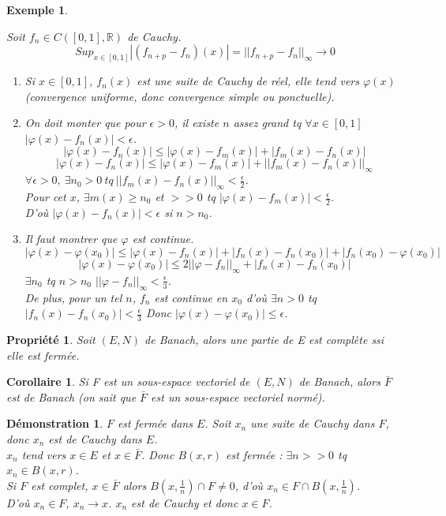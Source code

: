 \documentclass[a4paper, oneside]{report}
\theoremstyle{break}
\newtheorem{propr}[thm]{Propriété}
\newtheorem{cor}[thm]{Corollaire}
\newtheorem{exem}[thm]{Exemple}
\newtheorem*{demo}{Démonstration}
\newcommand{\R}{\mathbb{R}}
\newcommand{\sev}{sous-espace vectoriel }
\newcommand{\fracun}[1]{\frac{1}{#1}}
\begin{document}
\begin{exem}
\begin{enumerate}
Soit $f_n\in C([0,1],\R)$ de Cauchy.
$$Sup_{x\in [0,1]} |(f_{n+p}-f_n)(x)| = ||f_{n+p}-f_n||_\infty \rightarrow 0$$
\begin{enumerate}
\item Si $x\in [0,1]$, $f_n(x)$ est une suite de Cauchy de réel, elle tend vers $\varphi(x)$ (convergence uniforme, donc convergence simple ou ponctuelle).\\
\item On doit monter que pour $\epsilon >0$, il existe $n$ assez grand tq $\forall x\in [0,1]$ $|\varphi(x)-f_n(x)|<\epsilon$.\\
$$|\varphi(x)-f_n(x)| \leq |\varphi(x)-f_m(x)|+|f_m(x)-f_n(x)|$$
$$|\varphi(x)-f_n(x)| \leq  |\varphi(x)-f_m(x)|+||f_m(x)-f_n(x)||_\infty$$
$\forall \epsilon >0,~ \exists n_0>0~tq~||f_m(x)-f_n(x)||_\infty < \frac{\epsilon}{2}$.\\
Pour cet $x$, $\exists m(x)\geq n_0$ et $>>0$ tq $|\varphi(x)-f_m(x)|< \frac{\epsilon}{2}$.\\
D'où $|\varphi(x)-f_n(x)|< \epsilon$ si $n>n_0$.\\
\item Il faut montrer que $\varphi$ est continue.
$$|\varphi(x)-\varphi(x_0)|\leq  |\varphi(x)-f_n(x)|+|f_n(x)-f_n(x_0)|+|f_n(x_0)-\varphi(x_0)|$$
$$|\varphi(x)-\varphi(x_0)|\leq 2 ||\varphi - f_n||_\infty + |f_n(x)-f_n(x_0)|$$
$\exists n_0$ tq $n>n_0$ $||\varphi -f_n||_\infty <\frac{\epsilon}{3}$.\\
De plus, pour un tel $n$, $f_n$ est continue en $x_0$ d'où $\exists n>0$ tq $|f_n(x)-f_n(x_0)|<\frac{\epsilon}{3}$
Donc $|\varphi(x)-\varphi(x_0)|\leq \epsilon$.
\end{enumerate}
\end{enumerate}

\end{exem}


\begin{propr}
Soit $(E,N)$ de Banach, alors une partie de E est complète ssi elle est fermée.\\
\end{propr}



\begin{cor}
Si F est un \sev de $(E,N)$ de Banach, alors $\bar{F}$ est de Banach (on sait que $\bar{F}$ est un \sev normé).
\end{cor}


\begin{demo}
$F$ est fermée dans $E$. Soit $x_n$ une suite de Cauchy dans $F$, donc $x_n$ est de Cauchy dans $E$.\\
$x_n$ tend vers $x \in E$ et $x\in \bar{F}$. Donc $B(x,r)$ est fermée : $\exists n>>0$ tq $x_n\in B(x,r)$.\\
Si $F$ est complet, $x\in \bar{F}$ alors $B(x,\fracun{n}) \cap F \neq 0$, d'où $x_n \in F\cap B(x,\fracun{n})$.\\
D'où $x_n\in F$, $x_n\rightarrow x$. $x_n$ est de Cauchy et donc $x\in F$.
\end{demo}
\end{document}
